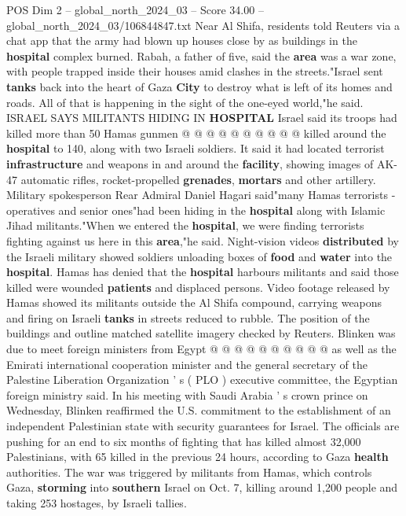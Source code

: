 \begin{textsample}{POS Dim 2 – global\_north\_2024\_03 – Score 34.00 – global\_north\_2024\_03/106844847.txt}
Near Al Shifa, residents told Reuters via a chat app that the army had blown up houses close by as buildings in the \textbf{hospital} complex burned.
Rabah, a father of five, said the \textbf{area} was a war zone, with people trapped inside their houses amid clashes in the streets."Israel sent \textbf{tanks} back into the heart of Gaza \textbf{City} to destroy what is left of its homes and roads.
All of that is happening in the sight of the one-eyed world,"he said.
ISRAEL SAYS MILITANTS HIDING IN \textbf{HOSPITAL} Israel said its troops had killed more than 50 Hamas gunmen @ @ @ @ @ @ @ @ @ @ killed around the \textbf{hospital} to 140, along with two Israeli soldiers.
It said it had located terrorist \textbf{infrastructure} and weapons in and around the \textbf{facility}, showing images of AK-47 automatic rifles, rocket-propelled \textbf{grenades}, \textbf{mortars} and other artillery.
Military spokesperson Rear Admiral Daniel Hagari said"many Hamas terrorists - operatives and senior ones"had been hiding in the \textbf{hospital} along with Islamic Jihad militants."When we entered the \textbf{hospital}, we were finding terrorists fighting against us here in this \textbf{area},"he said.
Night-vision videos \textbf{distributed} by the Israeli military showed soldiers unloading boxes of \textbf{food} and \textbf{water} into the \textbf{hospital}.
Hamas has denied that the \textbf{hospital} harbours militants and said those killed were wounded \textbf{patients} and displaced persons.
Video footage released by Hamas showed its militants outside the Al Shifa compound, carrying weapons and firing on Israeli \textbf{tanks} in streets reduced to rubble.
The position of the buildings and outline matched satellite imagery checked by Reuters.
Blinken was due to meet foreign ministers from Egypt @ @ @ @ @ @ @ @ @ @ as well as the Emirati international cooperation minister and the general secretary of the Palestine Liberation Organization ' s ( PLO ) executive committee, the Egyptian foreign ministry said.
In his meeting with Saudi Arabia ' s crown prince on Wednesday, Blinken reaffirmed the U.S. commitment to the establishment of an independent Palestinian state with security guarantees for Israel.
The officials are pushing for an end to six months of fighting that has killed almost 32,000 Palestinians, with 65 killed in the previous 24 hours, according to Gaza \textbf{health} authorities.
The war was triggered by militants from Hamas, which controls Gaza, \textbf{storming} into \textbf{southern} Israel on Oct. 7, killing around 1,200 people and taking 253 hostages, by Israeli tallies.

\end{textsample}

